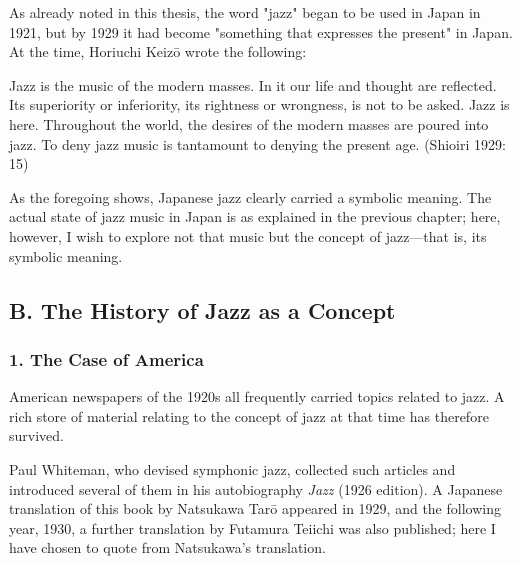 As already noted in this thesis, the word "jazz" began to be used in Japan in 1921, but by 1929 it had become "something that expresses the present" in Japan. At the time, Horiuchi Keizō wrote the following:

\begin{gquote}
Jazz is the music of the modern masses. In it our life and thought are reflected. Its superiority or inferiority, its rightness or wrongness, is not to be asked. Jazz is here. Throughout the world, the desires of the modern masses are poured into jazz. To deny jazz music is tantamount to denying the present age. (Shioiri 1929: 15)
\end{gquote}

As the foregoing shows, Japanese jazz clearly carried a symbolic meaning. The actual state of jazz music in Japan is as explained in the previous chapter; here, however, I wish to explore not that music but the concept of jazz—that is, its symbolic meaning.

\subsection{B. The History of Jazz as a Concept}

\subsubsection{1. The Case of America}

American newspapers of the 1920s all frequently carried topics related to jazz. A rich store of material relating to the concept of jazz at that time has therefore survived.

Paul Whiteman, who devised symphonic jazz, collected such articles and introduced several of them in his autobiography \textit{Jazz} (1926 edition). A Japanese translation of this book by Natsukawa Tarō appeared in 1929, and the following year, 1930, a further translation by Futamura Teiichi was also published; here I have chosen to quote from Natsukawa's translation.

